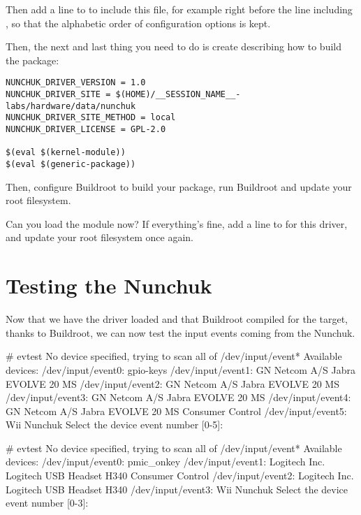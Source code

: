 Then add a line to  to include this file, for example right
before the line including ,
so that the alphabetic order of configuration options is kept.

Then, the next and last thing you need to do is create
 describing how to build
the package:

\begin{verbatim}
NUNCHUK_DRIVER_VERSION = 1.0
NUNCHUK_DRIVER_SITE = $(HOME)/__SESSION_NAME__-labs/hardware/data/nunchuk
NUNCHUK_DRIVER_SITE_METHOD = local
NUNCHUK_DRIVER_LICENSE = GPL-2.0

$(eval $(kernel-module))
$(eval $(generic-package))
\end{verbatim}

Then, configure Buildroot to build your package, run Buildroot and
update your root filesystem.

Can you load the  module now? If everything's fine, add a
line to  for this driver, and update your
root filesystem once again.

\section{Testing the Nunchuk}

Now that we have the  driver loaded and that Buildroot compiled
 for the target, thanks to Buildroot, we can now test the input
events coming from the Nunchuk.


\if{}
\begin{bashinput}
# evtest
No device specified, trying to scan all of /dev/input/event*
Available devices:
/dev/input/event0:	gpio-keys
/dev/input/event1:	GN Netcom A/S Jabra EVOLVE 20 MS
/dev/input/event2:	GN Netcom A/S Jabra EVOLVE 20 MS
/dev/input/event3:	GN Netcom A/S Jabra EVOLVE 20 MS
/dev/input/event4:	GN Netcom A/S Jabra EVOLVE 20 MS Consumer Control
/dev/input/event5:	Wii Nunchuk
Select the device event number [0-5]:
\end{bashinput}
\else
\begin{bashinput}
# evtest
No device specified, trying to scan all of /dev/input/event*
Available devices:
/dev/input/event0:	pmic_onkey
/dev/input/event1:	Logitech Inc. Logitech USB Headset H340 Consumer Control
/dev/input/event2:	Logitech Inc. Logitech USB Headset H340
/dev/input/event3:	Wii Nunchuk
Select the device event number [0-3]:
\end{bashinput}
\fi

